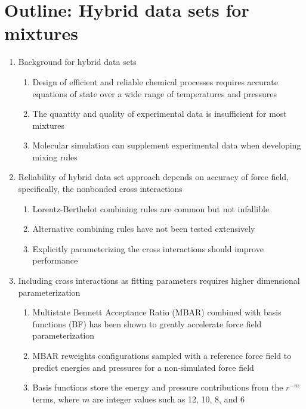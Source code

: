 \documentclass[11pt,a4paper]{article}
\begin{document}
\section{Outline: Hybrid data sets for mixtures}

\begin{enumerate}
	\item Background for hybrid data sets
	\begin{enumerate}
		\item Design of efficient and reliable chemical processes requires accurate equations of state over a wide range of temperatures and pressures
		\item The quantity and quality of experimental data is insufficient for most mixtures
		\item Molecular simulation can supplement experimental data when developing mixing rules
	\end{enumerate}
	\item Reliability of hybrid data set approach depends on accuracy of force field, specifically, the nonbonded cross interactions
	\begin{enumerate}
		\item Lorentz-Berthelot combining rules are common but not infallible
		\item Alternative combining rules have not been tested extensively
		\item Explicitly parameterizing the cross interactions should improve performance
	\end{enumerate}
	\item Including cross interactions as fitting parameters requires higher dimensional parameterization
	\begin{enumerate}
		\item Multistate Bennett Acceptance Ratio (MBAR) combined with basis functions (BF) has been shown to greatly accelerate force field parameterization
		\item MBAR reweights configurations sampled with a reference force field to predict energies and pressures for a non-simulated force field
		\item Basis functions store the energy and pressure contributions from the $r^{-m}$ terms, where $m$ are integer values such as 12, 10, 8, and 6
	\end{enumerate}
\end{enumerate}
\end{document}
